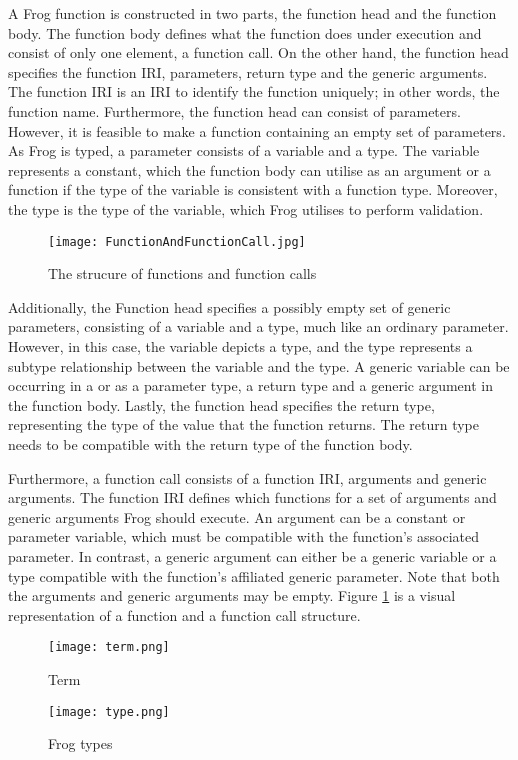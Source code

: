 \para
A Frog function is constructed in two parts, the function head and the function body. The function body defines what the function does under execution and consist of only one element, a function call. On the other hand, the function head specifies the function IRI, parameters, return type and the generic arguments. The function IRI is an IRI to identify the function uniquely; in other words, the function name. Furthermore, the function head can consist of parameters. However, it is feasible to make a function containing an empty set of parameters. As Frog is typed, a parameter consists of a variable and a type. The variable represents a constant, which the function body can utilise as an argument or a function if the type of the variable is consistent with a function type. Moreover, the type is the type of the variable, which Frog utilises to perform validation.

\begin{figure}[h]
    \centering
    \texttt{[image: FunctionAndFunctionCall.jpg]}
    \caption{The strucure of functions and function calls}
    \label{fig:functionCall_and_function}
\end{figure}

\para
Additionally, the Function head specifies a possibly empty set of generic parameters, consisting of a variable and a type, much like an ordinary parameter. However, in this case, the variable depicts a type, and the type represents a subtype relationship between the variable and the type. A generic variable can be occurring in a or as a parameter type, a return type and a generic argument in the function body. Lastly, the function head specifies the return type, representing the type of the value that the function returns. The return type needs to be compatible with the return type of the function body. 

\para
Furthermore, a function call consists of a function IRI, arguments and generic arguments. The function IRI defines which functions for a set of arguments and generic arguments Frog should execute. An argument can be a constant or parameter variable, which must be compatible with the function's associated parameter. In contrast, a generic argument can either be a generic variable or a type compatible with the function's affiliated generic parameter. Note that both the arguments and generic arguments may be empty. Figure \ref{fig:functionCall_and_function} is a visual representation of a function and a function call structure. 

\begin{figure}
    \centering
    \begin{minipage}{.5\textwidth}
      \centering
      \texttt{[image: term.png]}
      \caption{Term}
      \label{fig:term}
    \end{minipage}%
    \begin{minipage}{.5\textwidth}
      \centering
      \texttt{[image: type.png]}
      \caption{Frog types}
      \label{fig:type}
    \end{minipage}
\end{figure}

